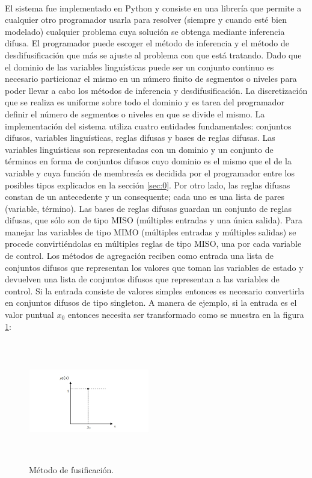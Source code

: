 \documentclass[a4paper,10pt]{article}
\begin{document}
	\paragraph{} El sistema fue implementado en Python y consiste en una librería que permite a cualquier otro programador usarla para
	resolver (siempre y cuando esté bien modelado) cualquier problema cuya solución se obtenga mediante inferencia difusa. El programador
	puede escoger el método de inferencia y el método de desdifusificación que más se ajuste al problema con que está tratando. Dado que el dominio de las variables 			linguísticas puede ser un conjunto continuo es necesario particionar el mismo en un número finito de segmentos o niveles para poder llevar a cabo los métodos de 				inferencia y desdifusificación. La discretización que se realiza es uniforme sobre todo el dominio  y es tarea del programador definir el número de segmentos o niveles en 		que se divide el mismo.  La implementación del sistema utiliza  cuatro entidades	fundamentales: conjuntos difusos, variables  linguísticas, reglas difusas y bases de reglas 		difusas. Las variables linguísticas son representadas con un dominio y un conjunto de términos en forma de conjuntos difusos cuyo dominio es el mismo que el de la 			variable y cuya función de membresía es decidida por el programador entre los posibles tipos explicados en la sección \ref{sec:0}. Por otro lado, las reglas difusas constan 		de un antecedente y un consequente; cada uno es una lista de pares (variable, término). Las bases de reglas difusas guardan un conjunto de reglas difusas, que sólo son 		de tipo MISO (múltiples entradas y una única salida). Para manejar las variables de tipo MIMO (múltiples entradas y múltiples salidas) se procede convirtiéndolas en 			múltiples reglas de tipo MISO, una por cada variable de control. Los métodos de agregación reciben como entrada una lista de conjuntos difusos que representan los 			valores que toman las variables de estado y devuelven una lista de conjuntos difusos que representan a las variables de control. Si la entrada consiste de valores simples 		entonces es necesario convertirla en conjuntos difusos de tipo singleton. A manera de ejemplo, si la entrada es el valor puntual $x_{0}$ entonces necesita ser 					transformado como se muestra en la figura \ref{fig:fuzzification}:
	
	\begin{figure}[h]
		\begin{center}		
			\includegraphics[width=200px, height=200px]{images/fuzzification.jpg}
		\end{center}
		\caption{Método de fusificación.\label{fig:fuzzification}}%
	\end{figure}
	
\end{document}

